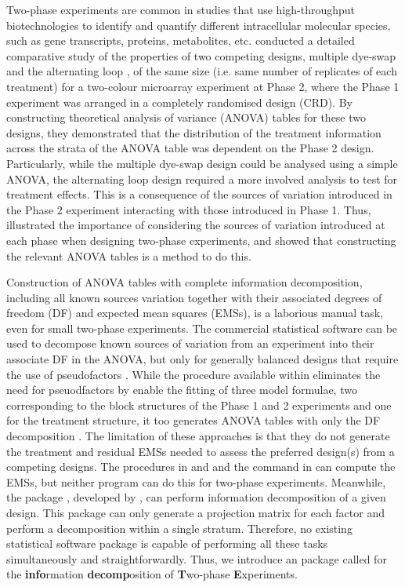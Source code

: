 \documentclass[article]{jss}
\begin{document}
Two-phase experiments are common in studies that use high-throughput biotechnologies to identify and quantify different intracellular molecular species, such as gene transcripts, proteins, metabolites, etc. \cite{Jarrett2008} conducted a detailed comparative study of the properties of two competing designs, multiple dye-swap and the alternating loop \citep{Churchill2002}, of the same size (i.e. same number of replicates of each treatment) for a two-colour microarray experiment at Phase 2, where the Phase 1 experiment was arranged in a completely randomised design (CRD). By constructing theoretical analysis of variance (ANOVA) tables for these two designs, they demonstrated that the distribution of the treatment information across the strata of the ANOVA table was dependent on the Phase 2 design. Particularly, while the multiple dye-swap design could be analysed using a simple ANOVA, the alternating loop design required a more involved analysis to test for treatment effects. This is a consequence of the sources of variation introduced in the Phase 2 experiment interacting with those introduced in Phase 1. Thus, \cite{Jarrett2008} illustrated the importance of considering the sources of variation introduced at each phase when designing two-phase experiments, and showed that constructing the relevant ANOVA tables is a method to do this.

Construction of ANOVA tables with complete information decomposition, including all known sources variation together with their associated degrees of freedom (DF) and expected mean squares (EMSs), is a laborious manual task, even for small two-phase experiments. The commercial statistical software  can be used to decompose known sources of variation from an experiment into their associate DF in the ANOVA, but only for generally balanced designs that require the use of pseudofactors \citep{Monod1992}. While the  procedure available within  eliminates the need for pseuodfactors by enable the fitting of three model formulae, two corresponding to the block structures of the Phase 1 and 2 experiments and one for the treatment structure, it too generates ANOVA tables with only the DF decomposition \citep{Brien2006a}. The limitation of these approaches is that they do not generate the treatment and residual EMSs needed to assess the preferred design(s) from a competing designs. The  procedures in  and  and the  command in  can compute the EMSs, but neither program can do this for two-phase experiments. Meanwhile, the  package , developed by \cite{Brien2011a}, can perform information decomposition of a given design. This package can only generate a projection matrix for each factor and perform a decomposition within a single stratum.  Therefore, no existing statistical software package is capable of performing all these tasks simultaneously and straightforwardly. Thus, we introduce an  package called  for the {\bf info}rmation {\bf decomp}osition of {\bf T}wo-phase {\bf E}xperiments.
\end{document}
